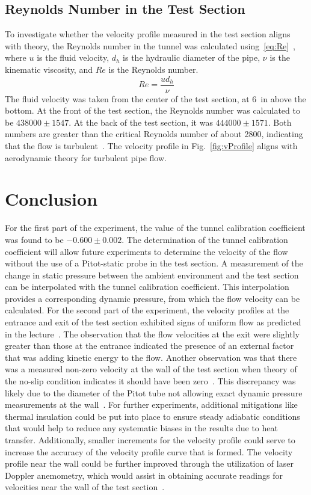 \documentclass[journal,letterpaper]{IEEEtran}
\begin{document}
\subsection{Reynolds Number in the Test Section}

To investigate whether the velocity profile measured in the test section aligns with theory, the Reynolds number in the tunnel was calculated using~\eqref{eq:Re}~\cite{HeatTransfer}, where $u$ is the fluid velocity, $d_h$ is the hydraulic diameter of the pipe, $\nu$ is the kinematic viscosity, and $Re$ is the Reynolds number.
\begin{equation} \label{eq:Re}
    Re = \frac{ud_h}{\nu}
\end{equation}
The fluid velocity was taken from the center of the test section, at \qty{6}{in} above the bottom.
At the front of the test section, the Reynolds number was calculated to be $438000 \pm 1547$. At the back of the test section, it was $444000 \pm 1571$. Both numbers are greater than the critical Reynolds number of about 2800, indicating that the flow is turbulent~\cite{HeatTransfer}. The velocity profile in Fig.~\ref{fig:vProfile} aligns with aerodynamic theory for turbulent pipe flow.


\section{Conclusion}


For the first part of the experiment, the value of the tunnel calibration coefficient was found to be $-0.600 \pm 0.002$.
The determination of the tunnel calibration coefficient will allow future experiments to determine the velocity of the flow without the use of a Pitot-static probe in the test section.
A measurement of the change in static pressure between the ambient environment and the test section can be interpolated with the tunnel calibration coefficient.
This interpolation provides a corresponding dynamic pressure, from which the flow velocity can be calculated.
For the second part of the experiment, the velocity profiles at the entrance and exit of the test section exhibited signs of uniform flow as predicted in the lecture~\cite{lecture}.
The observation that the flow velocities at the exit were slightly greater than those at the entrance indicated the presence of an external factor that was adding kinetic energy to the flow.
Another observation was that there was a measured non-zero velocity at the wall of the test section when theory of the no-slip condition indicates it should have been zero~\cite{Aero}.
This discrepancy was likely due to the diameter of the Pitot tube not allowing exact dynamic pressure measurements at the wall~\cite{Aero}.
For further experiments, additional mitigations like thermal insulation could be put into place to ensure steady adiabatic conditions that would help to reduce any systematic biases in the results due to heat transfer.
Additionally, smaller increments for the velocity profile could serve to increase the accuracy of the velocity profile curve that is formed.
The velocity profile near the wall could be further improved through the utilization of laser Doppler anemometry, which would assist in obtaining accurate readings for velocities near the wall of the test section~\cite{PitotLecture}.  
\end{document}
